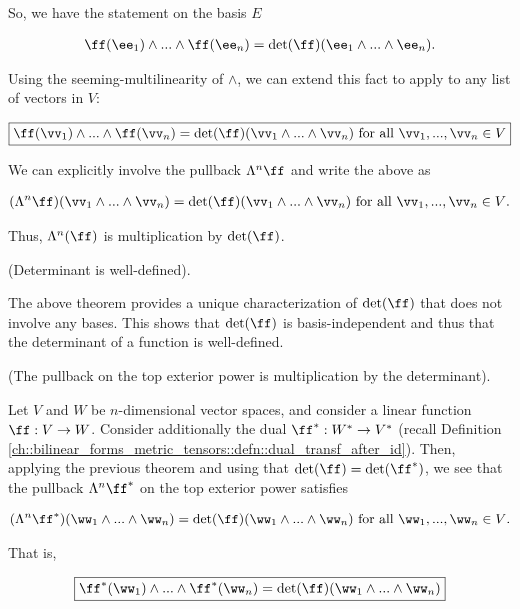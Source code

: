 \begin{theorem}
   So, we have the statement on the basis $E$
   
   \begin{align*}
        \ff(\ee_1) \wedge ... \wedge 
        \ff(\ee_n) = \det(\ff) (\ee_1 \wedge ... \wedge \ee_n).
   \end{align*}
   
   Using the seeming-multilinearity of $\wedge$, we can extend this fact to apply to any list of vectors in $V$:
   
   \begin{align*}
       \boxed
       {
        \ff(\vv_1) \wedge ... \wedge \ff(\vv_n) = \det(\ff) ( \vv_1 \wedge ... \wedge \vv_n ) \text{ for all $\vv_1, ..., \vv_n \in V$}
       }
   \end{align*}
   
   We can explicitly involve the pullback $\Lambda^n \ff$ and write the above as
   
   \begin{align*}
       (\Lambda^n \ff)(\vv_1 \wedge ... \wedge \vv_n) = \det(\ff) ( \vv_1 \wedge ... \wedge \vv_n ) \text{ for all $\vv_1, ..., \vv_n \in V$}.
   \end{align*}
   
   Thus, $\Lambda^n(\ff)$ is multiplication by $\det(\ff)$.
\end{theorem}

\begin{remark}
    (Determinant is well-defined).
    
    The above theorem provides a unique characterization of $\det(\ff)$ that does not involve any bases. This shows that $\det(\ff)$ is basis-independent and thus that the determinant of a function is well-defined.
\end{remark}

\begin{theorem}
    (The pullback on the top exterior power is multiplication by the determinant).
    
    Let $V$ and $W$ be $n$-dimensional vector spaces, and consider a linear function $\ff:V \rightarrow W$. Consider additionally the dual $\ff^*:W^* \rightarrow V^*$ (recall Definition \ref{ch::bilinear_forms_metric_tensors::defn::dual_transf_after_id}). Then, applying the previous theorem and using that $\det(\ff) = \det(\ff^*)$, we see that the pullback $\Lambda^n \ff^*$ on the top exterior power satisfies
    
    \begin{align*}
        (\Lambda^n \ff^*)(\ww_1 \wedge ... \wedge \ww_n) = \det(\ff) ( \ww_1 \wedge ... \wedge \ww_n ) \text{ for all $\ww_1, ..., \ww_n \in V$}.
    \end{align*}
    
    That is,
    
    \begin{align*}
        \boxed
        {
            \ff^*(\ww_1) \wedge ... \wedge \ff^*(\ww_n) = \det(\ff)(\ww_1 \wedge ... \wedge \ww_n)
        }
    \end{align*}
\end{theorem}

